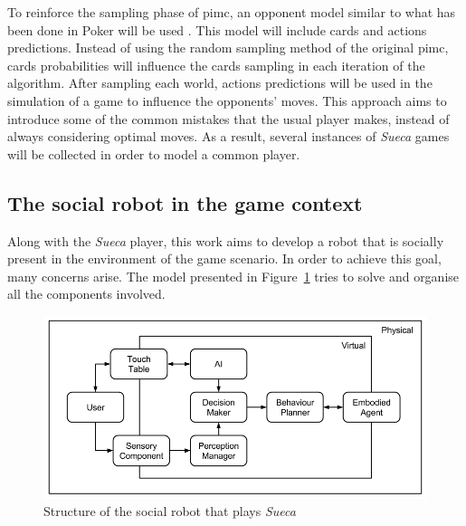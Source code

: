 To reinforce the sampling phase of \gls{pimc}, an opponent model similar to what has been done in Poker will be used \cite{Ponsen2008}.
This model will include cards and actions predictions.
Instead of using the random sampling method of the original \gls{pimc}, cards probabilities will influence the cards sampling in each iteration of the algorithm.
After sampling each world, actions predictions will be used in the simulation of a game to influence the opponents' moves.
This approach aims to introduce some of the common mistakes that the usual player makes, instead of always considering optimal moves.
As a result, several instances of \emph{Sueca} games will be collected in order to model a common player.


\subsection{The social robot in the game context}
\label{sec:social_solution}

Along with the \emph{Sueca} player, this work aims to develop a robot that is socially present in the environment of the game scenario.
In order to achieve this goal, many concerns arise.
The model presented in Figure~\ref{fig:model} tries to solve and organise all the components involved.

\begin{figure}[ht]
  \centering
    \includegraphics[width=1\textwidth]{./img/model}
  \caption{Structure of the social robot that plays \emph{Sueca}}
\label{fig:model}
\end{figure}

